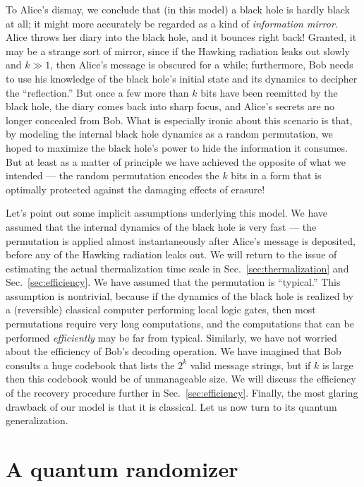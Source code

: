 \documentclass[12pt]{article}
\begin{document}
To Alice's dismay, we conclude that (in this model) a black hole is hardly black at all; it might more accurately be regarded as a kind of {\em information mirror}. Alice throws her diary into the black hole, and it bounces right back! Granted, it may be a strange sort of mirror, since if the Hawking radiation leaks out slowly and $k \gg 1$, then Alice's message is obscured for a while; furthermore, Bob needs to use his knowledge of the black hole's initial state and its dynamics to decipher the ``reflection.'' But once a few more than $k$ bits have been reemitted by the black hole, the diary comes back into sharp focus, and Alice's secrets are no longer concealed from Bob. What is especially ironic about this scenario is that, by modeling the internal black hole dynamics as a random permutation, we hoped to maximize the black hole's power to hide the information it consumes. But at least as a matter of principle we have achieved the opposite of what we intended ---  the random permutation encodes the $k$ bits in a form that is optimally protected against the damaging effects of erasure! 

Let's point out some implicit assumptions underlying this model. We have assumed that the internal dynamics of the black hole is very fast --- the permutation is applied almost instantaneously after Alice's message is deposited, before any of the Hawking radiation leaks out. We will return to the issue of estimating the actual thermalization time scale in Sec.~\ref{sec:thermalization} and Sec.~\ref{sec:efficiency}. We have assumed that the permutation is ``typical.'' This assumption is nontrivial, because if the dynamics of the black hole is realized by a (reversible) classical computer performing local logic gates, then most permutations require very long computations, and the computations that can be performed {\em efficiently} may be far from typical. Similarly, we have not worried about the efficiency of Bob's decoding operation. We have imagined that Bob consults a huge codebook that lists the $2^k$ valid message strings, but if $k$ is large then this codebook would be of unmanageable size. We will discuss the efficiency of the recovery procedure further in Sec.~\ref{sec:efficiency}. Finally, the most glaring drawback of our model is that it is classical. Let us now turn to its quantum generalization. 


\section{A quantum randomizer}
\label{sec:quantum}
\end{document}
